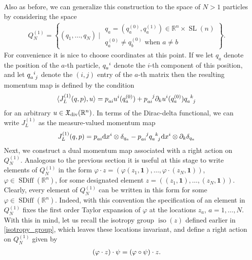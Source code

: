 \documentclass[12pt]{amsart}
\newcommand{\R}{\ensuremath{\mathbb{R}}}
\newcommand{\dx}{\ensuremath{\textrm{d}x}}
\DeclareMathOperator{\SDiff}{SDiff}
\DeclareMathOperator{\SL}{SL}
\DeclareMathOperator{\iso}{iso}
\begin{document}
  Also as before, we can generalize this construction to the space of
  $N > 1$ particles by considering the space
  \begin{align*}
    Q^{(1)}_N = \left\{  ( q_1 , \dots, q_N ) \mid
      \begin{array}{c}
        q_a = (q^{(0)}_a,q^{(1)}_a) \in \R^n \times \SL(n) \\
        q^{(0)}_a \neq q^{(0)}_b \text{ when } a \neq b
      \end{array} \right\}.
  \end{align*}
  For convenience it is nice to choose coordinates at this point.
  If we let $q_a$ denote the position of the $a$-th particle,
  $q\indices{_a^i}$ denote the $i$-th component of this position,
  and let $q\indices{_a^i_j}$ denote the $(i,j)$ entry of the $a$-th
  matrix then the resulting momentum map is defined by the condition
  \begin{align*}
    \langle J_L^{(1)}(q,p) , u \rangle
    = p\indices{_a_i} u^i(q^{(0)}_a) + p\indices{_a_i^j} \partial_k u^i(q^{(0)}_a) q\indices{_a^k_j}
  \end{align*}
  for an arbitrary $u \in \mathfrak{X}_{\rm div}(\R^n)$.
  In terms of the Dirac-delta functional, we can write $J_L^{(1)}$ as the measure-valued momentum map
  \begin{align*}
    J_L^{(1)}(q, p)
    = p\indices{_a_i} \dx^i \otimes \delta_{q_a}
     -p\indices{_a_i^j} q\indices{_a^k_j} \dx^i \otimes \partial_k \delta_{q_a}
  \end{align*}
  Next, we construct a dual momentum map associated with a right action on $Q_N^{(1)}$. Analogous to the previous section  it is useful at this stage to write elements of $Q_N^{(1)}$ in the form $ \varphi \cdot z = (\varphi (z_1, {\mathbf{1}}), \ldots, \varphi \cdot (z_N , \mathbf{1}))$, $\varphi \in \SDiff(\mathbb{R}^n)$, for some designated element $ z=( (z_1, \mathbf{1}), \ldots, (z_N, \mathbf{1}))$. Clearly, every element of $Q_N^{(1)}$ can be written in this form for some  $\varphi \in \SDiff(\mathbb{R}^n)$. Indeed, with this convention the specification of an element in $Q_N^{(1)}$ fixes the first order Taylor expansion of $\varphi$ at the locations $z_a$, $a = 1, \ldots, N$. With this in mind, let us recall the isotropy group $\iso(z)$ defined earlier in \eqref{isotropy_group}, which leaves these locations invariant, and define a right action on  $Q_N^{(1)}$ given by 
\begin{align}
	 (\varphi \cdot z) \cdot \psi  = (\varphi \circ \psi) \cdot z. \notag
	 \end{align}
\end{document}
